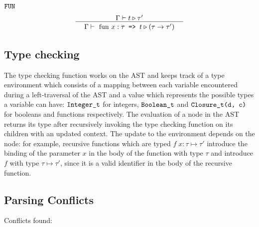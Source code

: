 \documentclass[a4paper,11pt]{report}
\begin{document}
$\verb|FUN|$
\\
\[
\inference[]
{ 
\Gamma \vdash t \triangleright \tau'
}
{
\begin{array}{c}
\Gamma \vdash  \text{ fun } x:\tau \texttt{ => } t \triangleright (\tau \rightarrow \tau')
\end{array}
}
\]

\subsection{Type checking}

The type checking function works on the AST and keeps track of a type environment which consists of a mapping between each variable encountered during a left-traversal of the AST and a value which represents the possible types a variable can have:
$\verb|Integer_t|$ for integers, $\verb|Boolean_t|$  and $\verb|Closure_t(d, c)|$ for booleans and functions respectively. The evaluation of a node in the AST returns its type after recursively invoking the type checking function on its children with an updated context. The update to the environment depends on the node: for example, recursive functions which are typed $f \;x : \tau \mapsto \tau'$ introduce the binding of the parameter $x$ in the body of the function with type $\tau$ and introduce $f$ with type $\tau \mapsto \tau'$, since it is a valid identifier in the body of the recursive function.

\subsection{Parsing Conflicts}

Conflicts found:
\end{document}

